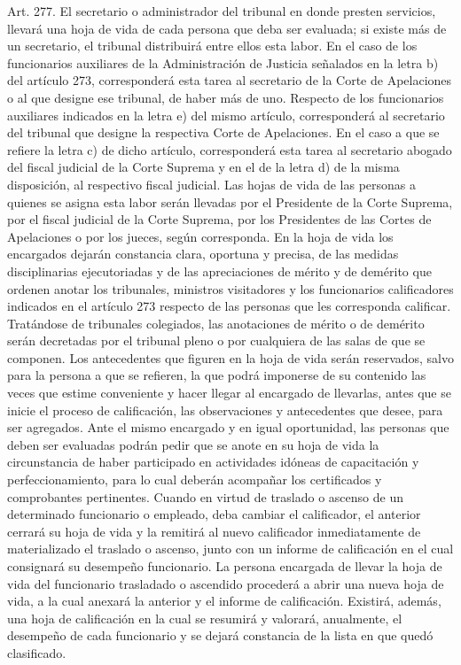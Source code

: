     Art. 277. El secretario o administrador del tribunal en donde presten servicios, llevará una hoja de vida de cada persona que deba ser evaluada; si existe más de un secretario, el tribunal distribuirá entre ellos esta labor.
    En el caso de los funcionarios auxiliares de la Administración de Justicia señalados en la letra b) del artículo 273, corresponderá esta tarea al secretario de la Corte de Apelaciones o al que designe ese tribunal, de haber más de uno. Respecto de los funcionarios auxiliares indicados en la letra e) del mismo artículo, corresponderá al secretario del tribunal que designe la respectiva Corte de Apelaciones. En el caso a que se refiere la letra c) de dicho artículo, corresponderá esta tarea al secretario abogado del fiscal judicial de la Corte Suprema y en el de la letra d) de la misma disposición, al respectivo fiscal judicial.
    Las hojas de vida de las personas a quienes se asigna esta labor serán llevadas por el Presidente de la Corte Suprema, por el fiscal judicial de la Corte Suprema, por los Presidentes de las Cortes de Apelaciones o por los jueces, según corresponda.
    En la hoja de vida los encargados dejarán constancia clara, oportuna y precisa, de las medidas disciplinarias ejecutoriadas y de las apreciaciones de mérito y de demérito que ordenen anotar los tribunales, ministros visitadores y los funcionarios calificadores indicados en el artículo 273 respecto de las personas que les corresponda calificar. Tratándose de tribunales colegiados, las anotaciones de mérito o de demérito serán decretadas por el tribunal pleno o por cualquiera de las salas de que se componen.
    Los antecedentes que figuren en la hoja de vida serán reservados, salvo para la persona a que se refieren, la que podrá imponerse de su contenido las veces que estime conveniente y hacer llegar al encargado de llevarlas, antes que se inicie el proceso de calificación, las observaciones y antecedentes que desee, para ser agregados.
    Ante el mismo encargado y en igual oportunidad, las personas que deben ser evaluadas podrán pedir que se anote en su hoja de vida la circunstancia de haber participado en actividades idóneas de capacitación y perfeccionamiento, para lo cual deberán acompañar los certificados y comprobantes pertinentes.
    Cuando en virtud de traslado o ascenso de un determinado funcionario o empleado, deba cambiar el calificador, el anterior cerrará su hoja de vida y la remitirá al nuevo calificador inmediatamente de materializado el traslado o ascenso, junto con un informe de calificación en el cual consignará su desempeño funcionario. La persona encargada de llevar la hoja de vida del funcionario trasladado o ascendido procederá a abrir una nueva hoja de vida, a la cual anexará la anterior y el informe de calificación.
    Existirá, además, una hoja de calificación en la cual se resumirá y valorará, anualmente, el desempeño de cada funcionario y se dejará constancia de la lista en que quedó clasificado.

